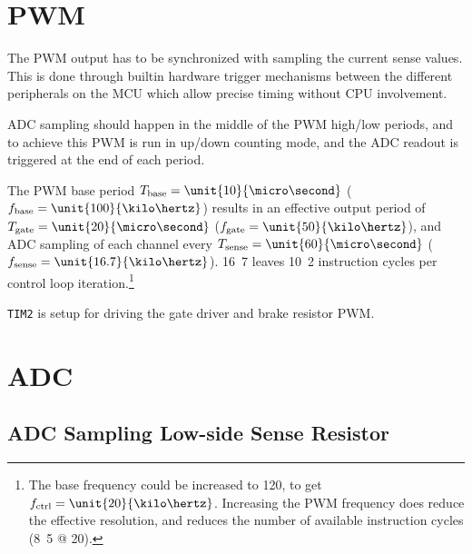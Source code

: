 \documentclass[12pt,a4paper,oneside,openany]{article}
\begin{document}


\section{PWM}

The PWM output has to be synchronized with sampling the current sense values. This is done through builtin hardware trigger mechanisms between the different peripherals on the MCU which allow precise timing without CPU involvement.

ADC sampling should happen in the middle of the PWM high/low periods, and to achieve this PWM is run in up/down counting mode, and the ADC readout is triggered at the end of each period.

The PWM base period $T_{\textrm{base}} = \unit{10}{\micro\second}$ ($f_{\textrm{base}} = \unit{100}{\kilo\hertz}$) results in an effective output period of $T_{\textrm{gate}} = \unit{20}{\micro\second}$ ($f_{\textrm{gate}} = \unit{50}{\kilo\hertz}$), and ADC sampling of each channel every $T_{\textrm{sense}} = \unit{60}{\micro\second}$ ($f_{\textrm{sense}} = \unit{16.7}{\kilo\hertz}$). \unit{16.7}{\kilo\hertz} leaves \unit{10.2}{\kilo} instruction cycles per control loop iteration.\footnote{The base frequency could be increased to \unit{120}{\kilo\hertz}, to get $f_{\textrm{ctrl}} = \unit{20}{\kilo\hertz}$. Increasing the PWM frequency does reduce the effective resolution, and reduces the number of available instruction cycles (\unit{8.5}{\kilo} @ \unit{20}{\kilo\hertz}).}

\texttt{TIM2} is setup for driving the gate driver and brake resistor PWM.

\section {ADC}

\subsection{ADC Sampling Low-side Sense Resistor}
\end{document}
